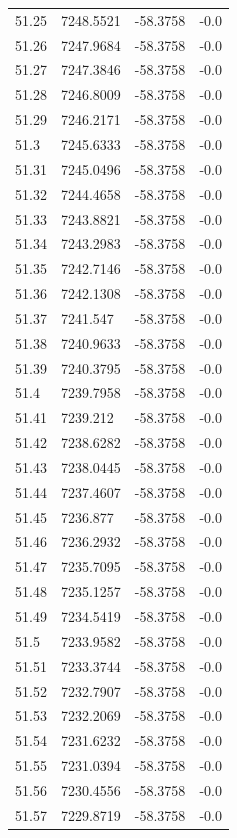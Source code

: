 \begin{table}[H]
\begin{tabular}{llll}
51.25 & 7248.5521 & -58.3758 & -0.0 \\
51.26 & 7247.9684 & -58.3758 & -0.0 \\
51.27 & 7247.3846 & -58.3758 & -0.0 \\
51.28 & 7246.8009 & -58.3758 & -0.0 \\
51.29 & 7246.2171 & -58.3758 & -0.0 \\
51.3 & 7245.6333 & -58.3758 & -0.0 \\
51.31 & 7245.0496 & -58.3758 & -0.0 \\
51.32 & 7244.4658 & -58.3758 & -0.0 \\
51.33 & 7243.8821 & -58.3758 & -0.0 \\
51.34 & 7243.2983 & -58.3758 & -0.0 \\
51.35 & 7242.7146 & -58.3758 & -0.0 \\
51.36 & 7242.1308 & -58.3758 & -0.0 \\
51.37 & 7241.547 & -58.3758 & -0.0 \\
51.38 & 7240.9633 & -58.3758 & -0.0 \\
51.39 & 7240.3795 & -58.3758 & -0.0 \\
51.4 & 7239.7958 & -58.3758 & -0.0 \\
51.41 & 7239.212 & -58.3758 & -0.0 \\
51.42 & 7238.6282 & -58.3758 & -0.0 \\
51.43 & 7238.0445 & -58.3758 & -0.0 \\
51.44 & 7237.4607 & -58.3758 & -0.0 \\
51.45 & 7236.877 & -58.3758 & -0.0 \\
51.46 & 7236.2932 & -58.3758 & -0.0 \\
51.47 & 7235.7095 & -58.3758 & -0.0 \\
51.48 & 7235.1257 & -58.3758 & -0.0 \\
51.49 & 7234.5419 & -58.3758 & -0.0 \\
51.5 & 7233.9582 & -58.3758 & -0.0 \\
51.51 & 7233.3744 & -58.3758 & -0.0 \\
51.52 & 7232.7907 & -58.3758 & -0.0 \\
51.53 & 7232.2069 & -58.3758 & -0.0 \\
51.54 & 7231.6232 & -58.3758 & -0.0 \\
51.55 & 7231.0394 & -58.3758 & -0.0 \\
51.56 & 7230.4556 & -58.3758 & -0.0 \\
51.57 & 7229.8719 & -58.3758 & -0.0 \\

\end{tabular}
\end{table}
